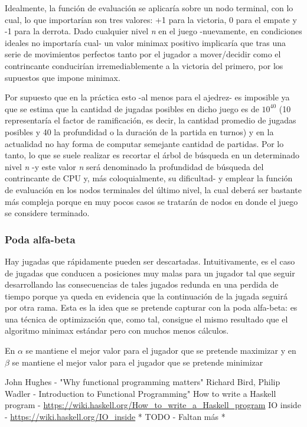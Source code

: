 \documentclass{llncs}
\begin{document}
Idealmente, la función de evaluación se aplicaría sobre un nodo terminal, con lo cual, lo que importarían son tres valores: +1 para la victoria, 0 para el empate y -1 para la derrota. Dado cualquier nivel \textit{n} en el juego -nuevamente, en condiciones ideales no importaría cual- un valor minimax positivo implicaría que tras una serie de movimientos perfectos tanto por el jugador a mover/decidir como el contrincante conducirían irremediablemente a la victoria del primero, por los supuestos que impone minimax.

Por supuesto que en la práctica esto -al menos para el ajedrez- es imposible ya que se estima que la cantidad de jugadas posibles en dicho juego es de $10^{40}$ (10 representaría el factor de ramificación, es decir, la cantidad promedio de jugadas posibles y 40 la profundidad o la duración de la partida en turnos) y en la actualidad no hay forma de computar semejante cantidad de partidas. Por lo tanto, lo que se suele realizar es recortar el árbol de búsqueda en un determinado nivel \textit{n} -y este valor \textit{n} será denominado la profundidad de búsqueda del contrincante de CPU y, más coloquialmente, su dificultad- y emplear la función de evaluación en los nodos terminales del último nivel, la cual deberá ser bastante más compleja porque en muy pocos casos se tratarán de nodos en donde el juego se considere terminado.


\subsubsection{ Poda alfa-beta }

Hay jugadas que rápidamente pueden ser descartadas. Intuitivamente, es el caso de jugadas que conducen a posiciones muy malas para un jugador tal que seguir desarrollando las consecuencias de tales jugados redunda en una perdida de tiempo porque ya queda en evidencia que la continuación de la jugada seguirá por otra rama. Esta es la idea que se pretende capturar con la poda alfa-beta: es una técnica de optimización que, como tal, consigue el mismo resultado que el algoritmo minimax estándar pero con muchos menos cálculos.

En $\alpha$ se mantiene el mejor valor para el jugador que se pretende maximizar y en $\beta$ se mantiene el mejor valor para el jugador que se pretende minimizar


%
%
\begin{thebibliography}{}
  John Hughes - "Why functional programming matters"
  Richard Bird, Philip Wadler - Introduction to Functional Programming"
    How to write a Haskell program - \url{https://wiki.haskell.org/How\_to\_write\_a\_Haskell\_program}
    IO inside - \url{https://wiki.haskell.org/IO\_inside}
    * TODO - Faltan más *
\end{thebibliography}
\end{document}
